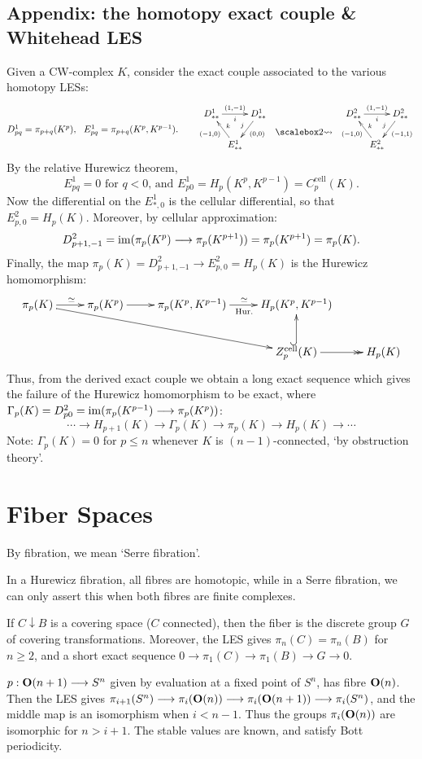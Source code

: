 \documentclass[11pt]{article}
\begin{document}
{\subsection{Appendix: the homotopy exact couple \& Whitehead LES}
Given a CW-complex $K$, consider the exact couple associated to the various 
homotopy LESs:
\[
\raisebox{-.6cm}
{$D_{pq}^1=\pi_{p+q}(K^p),\ \ E_{pq}^1=\pi_{p+q}(K^p,K^{p-1})$.\qquad}
\xymatrix@R=.6cm@C=.1cm{
D^1_{**}\ar[rr]_{i}^{(1,-1)}&&D^1_{**}\ar[dl]_j^{(0,0)}\\
&E^1_{**}\ar[lu]_k^{(-1,0)}
}
\raisebox{-.7cm}{\ \ \bigrightsquig\ \ }
\xymatrix@R=.6cm@C=.1cm{
D^2_{**}\ar[rr]_{i}^{(1,-1)}&&D^2_{**}\ar[dl]_j^{(-1,1)}\\
&E^2_{**}\ar[lu]_k^{(-1,0)}
}
\]
By the relative Hurewicz theorem, 
\[E^1_{pq}=0\text{ for $q<0$, and }
E^1_{p0}=H_p(K^p,K^{p-1})=C^\text{cell}_p(K).\]
Now the differential on the $E^1_{*,0}$ is the cellular differential, so that
$E^2_{p,0}=H_p(K)$. Moreover, by cellular approximation:
\[D^2_{p+1,-1}=\operatorname{im}(\pi_p(K^p)\longrightarrow \pi_p(K^{p+1}))=\pi_p(K^{p+1})=\pi_p(K).\]
Finally, the map $\pi_p(K)=D^2_{p+1,-1}\to E^2_{p,0}=H_p(K)$ is the Hurewicz
homomorphism:
\[\xymatrix{
\pi_p(K)\ar[r]^\simeq\ar[rrrd]&\pi_p(K^p)\ar[r]&
\pi_p(K^p,K^{p-1})\ar[r]^\simeq_{\text{Hur.}}&H_p(K^p,K^{p-1})\\
&&&Z_p^\text{cell}(K)\ar@{^{(}->}[u]\ar@{->>}[r]&H_p(K)
}\]
Thus, from the derived exact couple we obtain a long exact sequence which gives
the failure of the Hurewicz homomorphism to be exact, where
$\Gamma_p(K)=D_{p0}^2=\operatorname{im}(\pi_p(K^{p-1})\longrightarrow\pi_p(K^p))$:
\[\cdots\to H_{p+1}(K)\to \Gamma_p(K)\to\pi_p(K)\to H_p(K)\to\cdots\]
Note: $\Gamma_p(K)=0$ for $p\leq n$ whenever $K$ is $(n-1)$-connected, `by
obstruction theory'.
\section{Fiber Spaces}
\begin{itemise}
\item By fibration, we mean `Serre fibration'.
\item In a Hurewicz fibration, all fibres are homotopic, while in a Serre fibration, we can only assert this when both fibres are finite complexes.
\item If $C\downarrow B$ is a covering space ($C$ connected), then the fiber is the discrete group $G$ of covering transformations. Moreover, the LES gives $\pi_n(C)=\pi_n(B)$ for $n\geq2$, and a short exact sequence $0\to\pi_1(C)\to\pi_1(B)\to G\to0$.
\item $p:\textup{\textbf{O}}(n+1)\longrightarrow S^n$ given by evaluation at a fixed point of $S^n$, has fibre $\textup{\textbf{O}}(n)$. Then the LES gives $\pi_{i+1}(S^n)\longrightarrow\pi_i(\textup{\textbf{O}}(n))\longrightarrow\pi_i(\textup{\textbf{O}}(n+1))\longrightarrow\pi_i(S^n)$, and the middle map is an isomorphism when $i<n-1$. Thus the groups $\pi_i(\textup{\textbf{O}}(n))$ are isomorphic for $n>i+1$. The stable values are known, and satisfy Bott periodicity.
\end{itemise}
\setcounter{subsection}{3}
}
\end{document}
